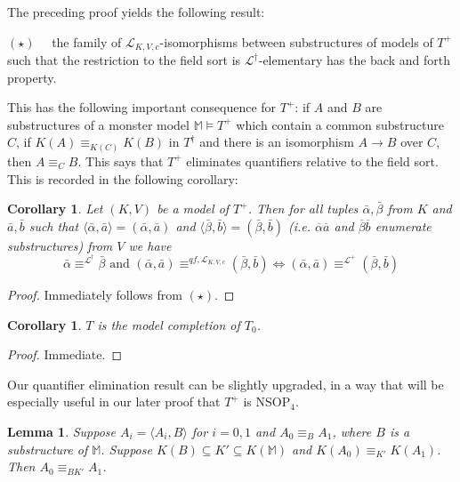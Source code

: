 \documentclass[psamsfonts]{amsart}
\newtheorem{cor}[thm]{Corollary}
\newtheorem{lem}[thm]{Lemma}
\newtheorem{corollary}[thm]{Corollary}
\theoremstyle{definition}
\theoremstyle{definition}
\theoremstyle{remark}
\numberwithin{equation}{section}
\newcommand\LL{\mathscr{L}}
\newcommand{\vect}[1]{\langle {#1} \rangle}
\renewcommand{\models}{\vDash}
\begin{document}
    The preceding proof yields the following result: 
        \begin{center}
            $(\star)\quad$ the family of $\LL_{K,V,c}$-isomorphisms between substructures of models of $T^+$ such that the restriction to the field sort is $\LL^\dagger$-elementary has the back and forth property. 
        \end{center} This has the following important consequence for $T^{+}$:  if $A$ and $B$ are substructures of a monster model $\mathbb{M} \models T^{+}$ which contain a common substructure $C$, if $K(A) \equiv_{K(C)} K(B)$ in $T^{\dagger}$ and there is an isomorphism $A \to B$ over $C$, then $A \equiv_{C} B$.  This says that $T^{+}$ eliminates quantifiers relative to the field sort.  This is recorded in the following corollary:

\begin{corollary}\label{cor:typedecomposition}
    Let $(K,V)$ be a model of $T^+$. Then for all tuples $\bar \alpha,\bar \beta$ from $K$ and $\bar a,\bar b$ such that $\vect{\bar \alpha,\bar a} = (\bar \alpha, \bar a)$ and $\vect{\bar \beta, \bar b} = (\bar \beta, \bar b)$ (i.e. $\overline{\alpha}\overline{a}$ and $\overline{\beta} \overline{b}$ enumerate substructures) from $V$ we have 
    \[\bar \alpha \equiv^{\LL^\dagger} \bar \beta \text{ and } (\bar \alpha,\bar a) \equiv^{qf,\LL_{K,V,c}} (\bar \beta,\bar b) \iff (\bar \alpha,\bar a) \equiv^{\LL^+} (\bar \beta,\bar b)\]
\end{corollary}
\begin{proof}
    Immediately follows from $(\star)$.
\end{proof}


\begin{cor}
 $T$ is the model completion of $T_{0}$.
\end{cor}

\begin{proof}
    Immediate. 
\end{proof}

Our quantifier elimination result can be slightly upgraded, in a way that will be especially useful in our later proof that $T^{+}$ is NSOP$_{4}$.  

\begin{lem} \label{lem:better base}
    Suppose $A_{i} = \langle A_{i},B \rangle$ for $i = 0,1$ and $A_{0} \equiv_{B} A_{1}$, where $B$ is a substructure of $\mathbb{M}$. Suppose $K(B) \subseteq K' \subseteq K(\mathbb{M})$ and $K(A_{0}) \equiv_{K'} K(A_{1})$.  Then $A_{0} \equiv_{BK'} A_{1}$. 
\end{lem}
\end{document}
